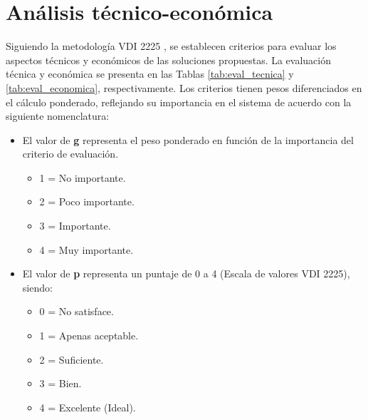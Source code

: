 \section{Análisis técnico-económica}

Siguiendo la metodología VDI 2225 \cite{VDI2225}, se establecen criterios para evaluar los aspectos técnicos y económicos de las soluciones propuestas. La evaluación técnica y económica se presenta en las Tablas \ref{tab:eval_tecnica} y \ref{tab:eval_economica}, respectivamente. Los criterios tienen pesos diferenciados en el cálculo ponderado, reflejando su importancia en el sistema de acuerdo con la siguiente nomenclatura:

\begin{itemize}
	\setlength\itemsep{0em}
	\item El valor de \textbf{g} representa el peso ponderado en función de la importancia del criterio de evaluación.
	\begin{itemize}
		\setlength\itemsep{0em}
		\item 1 = No importante.
		\item 2 = Poco importante.
		\item 3 = Importante.
		\item 4 = Muy importante.
	\end{itemize}
	\item El valor de \textbf{p} representa un puntaje de 0 a 4 (Escala de valores VDI 2225), siendo:
	\begin{itemize}
		\setlength\itemsep{0em}
		\item 0 = No satisface.
		\item 1 = Apenas aceptable.
		\item 2 = Suficiente.
		\item 3 = Bien.
		\item 4 = Excelente (Ideal).
	\end{itemize}
\end{itemize}


